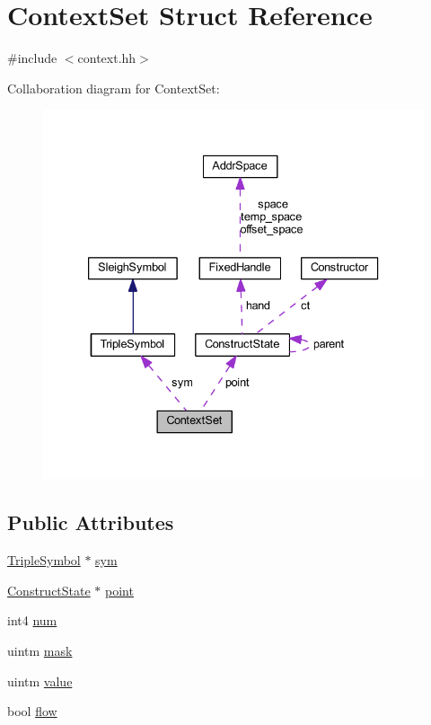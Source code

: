 \hypertarget{struct_context_set}{}\section{Context\+Set Struct Reference}
\label{struct_context_set}


{\ttfamily \#include $<$context.\+hh$>$}



Collaboration diagram for Context\+Set\+:
\nopagebreak
\begin{figure}[H]
\begin{center}
\leavevmode
\includegraphics[width=333pt]{struct_context_set__coll__graph}
\end{center}
\end{figure}
\subsection*{Public Attributes}
\begin{DoxyCompactItemize}
\item 
\mbox{\hyperlink{class_triple_symbol}{Triple\+Symbol}} $\ast$ \mbox{\hyperlink{struct_context_set_a4f5c531c6158b0937843596a9442fdc5}{sym}}
\item 
\mbox{\hyperlink{struct_construct_state}{Construct\+State}} $\ast$ \mbox{\hyperlink{struct_context_set_aa594f984cec1f3dbbec00c96fe22a34c}{point}}
\item 
int4 \mbox{\hyperlink{struct_context_set_a126fb90570bd829504d844bd3ff3dd8c}{num}}
\item 
uintm \mbox{\hyperlink{struct_context_set_a6523e5744b2235abf86edf11dd9b5f2f}{mask}}
\item 
uintm \mbox{\hyperlink{struct_context_set_a01757eacad380f2c8b6c008af4ce2538}{value}}
\item 
bool \mbox{\hyperlink{struct_context_set_a5cc09b961a0da9fa2a9503fb511703b8}{flow}}
\end{DoxyCompactItemize}



